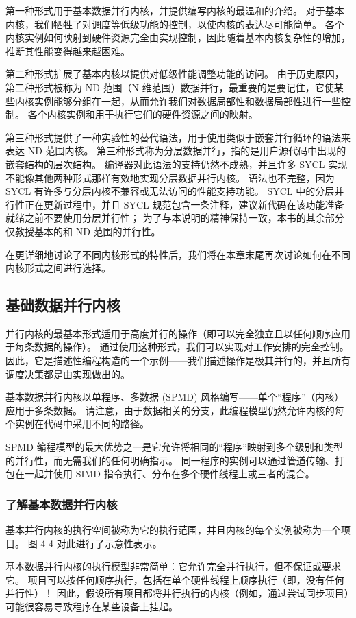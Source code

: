 第一种形式用于基本数据并行内核，并提供编写内核的最温和的介绍。 对于基本内核，我们牺牲了对调度等低级功能的控制，以使内核的表达尽可能简单。 各个内核实例如何映射到硬件资源完全由实现控制，因此随着基本内核复杂性的增加，推断其性能变得越来越困难。

第二种形式扩展了基本内核以提供对低级性能调整功能的访问。 由于历史原因，第二种形式被称为 ND 范围（N 维范围）数据并行，最重要的是要记住，它使某些内核实例能够分组在一起，从而允许我们对数据局部性和数据局部性进行一些控制。 各个内核实例和用于执行它们的硬件资源之间的映射。

第三种形式提供了一种实验性的替代语法，用于使用类似于嵌套并行循环的语法来表达 ND 范围内核。 第三种形式称为分层数据并行，指的是用户源代码中出现的嵌套结构的层次结构。 编译器对此语法的支持仍然不成熟，并且许多 SYCL 实现不能像其他两种形式那样有效地实现分层数据并行内核。 语法也不完整，因为 SYCL 有许多与分层内核不兼容或无法访问的性能支持功能。 SYCL 中的分层并行性正在更新过程中，并且 SYCL 规范包含一条注释，建议新代码在该功能准备就绪之前不要使用分层并行性； 为了与本说明的精神保持一致，本书的其余部分仅教授基本的和 ND 范围的并行性。

在更详细地讨论了不同内核形式的特性后，我们将在本章末尾再次讨论如何在不同内核形式之间进行选择。

\subsection{基础数据并行内核}
并行内核的最基本形式适用于高度并行的操作（即可以完全独立且以任何顺序应用于每条数据的操作）。 通过使用这种形式，我们可以实现对工作安排的完全控制。 因此，它是描述性编程构造的一个示例——我们描述操作是极其并行的，并且所有调度决策都是由实现做出的。

基本数据并行内核以单程序、多数据 (SPMD) 风格编写——单个“程序”（内核）应用于多条数据。 请注意，由于数据相关的分支，此编程模型仍然允许内核的每个实例在代码中采用不同的路径。

SPMD 编程模型的最大优势之一是它允许将相同的“程序”映射到多个级别和类型的并行性，而无需我们的任何明确指示。 同一程序的实例可以通过管道传输、打包在一起并使用 SIMD 指令执行、分布在多个硬件线程上或三者的混合。

\subsubsection{了解基本数据并行内核}
基本并行内核的执行空间被称为它的执行范围，并且内核的每个实例被称为一个项目。 图 4-4 对此进行了示意性表示。

基本数据并行内核的执行模型非常简单：它允许完全并行执行，但不保证或要求它。 项目可以按任何顺序执行，包括在单个硬件线程上顺序执行（即，没有任何并行性）！ 因此，假设所有项目都将并行执行的内核（例如，通过尝试同步项目）可能很容易导致程序在某些设备上挂起。

